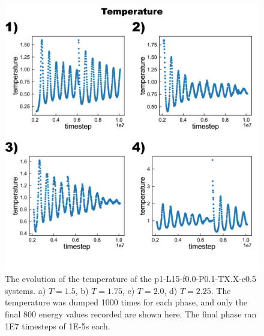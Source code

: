 \documentclass[12pt]{article}
\begin{document}
\begin{figure}[h!]\centering
	\includegraphics[width=\textwidth]{Figures/Temperature.png}
    \caption{The evolution of the temperature of the p1-L15-f0.0-P0.1-TX.X-e0.5 systems.
        a) $T = 1.5$, b) $T = 1.75$, c) $T = 2.0$, d) $T = 2.25$.
    The temperature was dumped 1000 times for each phase, and only the final 800 energy values recorded are shown here.
    The final phase ran 1E7 timesteps of 1E-5s each.
}
	\label{fig:T}
\end{figure}
\end{document}
